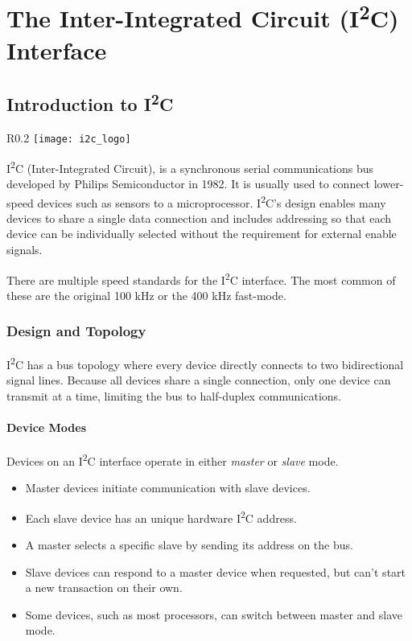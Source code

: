 \documentclass[11pt,fleqn]{book} %
\begin{document}
	
\chapter{The Inter-Integrated Circuit (I\textsuperscript{2}C) Interface}

\section{Introduction to I\textsuperscript{2}C}
    \begin{wrapfigure}{R}{0.2\textwidth}
        \centering\texttt{[image: i2c\_logo]}
    \end{wrapfigure}

    I\textsuperscript{2}C (Inter-Integrated Circuit), is a synchronous serial communications bus developed by Philips Semiconductor in 1982. It is usually used to connect lower-speed devices such as sensors to a microprocessor. I\textsuperscript{2}C's design enables many devices to share a single data connection and includes addressing so that each device can be individually selected without the requirement for external enable signals.
    
    There are multiple speed standards for the  I\textsuperscript{2}C interface. The most common of these are the original 100 kHz or the 400 kHz fast-mode.

    \subsection{Design and Topology}
            I\textsuperscript{2}C has a bus topology where every device directly connects to two bidirectional signal lines. Because all devices share a single connection, only one device can transmit at a time, limiting the bus to half-duplex communications. 

            \subsubsection{Device Modes}
            Devices on an I\textsuperscript{2}C interface operate in either \textit{master} or \textit{slave} mode. 
            \begin{itemize}
                \item Master devices initiate communication with slave devices.
                \item Each slave device has an unique hardware I\textsuperscript{2}C address.
                \item A master selects a specific slave by sending its address on the bus.
                \item Slave devices can respond to a master device when requested, but can't start a new transaction on their own.
                \item Some devices, such as most processors, can switch between master and slave mode.
            \end{itemize}
        
\end{document}
